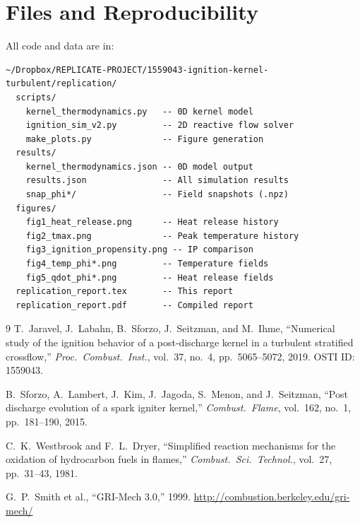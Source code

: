 \documentclass[11pt]{article}
\begin{document}
\section{Files and Reproducibility}

All code and data are in:
\begin{verbatim}
~/Dropbox/REPLICATE-PROJECT/1559043-ignition-kernel-turbulent/replication/
  scripts/
    kernel_thermodynamics.py   -- 0D kernel model
    ignition_sim_v2.py         -- 2D reactive flow solver
    make_plots.py              -- Figure generation
  results/
    kernel_thermodynamics.json -- 0D model output
    results.json               -- All simulation results
    snap_phi*/                 -- Field snapshots (.npz)
  figures/
    fig1_heat_release.png      -- Heat release history
    fig2_tmax.png              -- Peak temperature history
    fig3_ignition_propensity.png -- IP comparison
    fig4_temp_phi*.png         -- Temperature fields
    fig5_qdot_phi*.png         -- Heat release fields
  replication_report.tex       -- This report
  replication_report.pdf       -- Compiled report
\end{verbatim}

\begin{thebibliography}{9}
T.~Jaravel, J.~Labahn, B.~Sforzo, J.~Seitzman, and M.~Ihme,
``Numerical study of the ignition behavior of a post-discharge kernel in a turbulent stratified crossflow,''
\textit{Proc.\ Combust.\ Inst.}, vol.~37, no.~4, pp.~5065--5072, 2019.
OSTI ID: 1559043.

B.~Sforzo, A.~Lambert, J.~Kim, J.~Jagoda, S.~Menon, and J.~Seitzman,
``Post discharge evolution of a spark igniter kernel,''
\textit{Combust.\ Flame}, vol.~162, no.~1, pp.~181--190, 2015.

C.~K.~Westbrook and F.~L.~Dryer,
``Simplified reaction mechanisms for the oxidation of hydrocarbon fuels in flames,''
\textit{Combust.\ Sci.\ Technol.}, vol.~27, pp.~31--43, 1981.

G.~P.~Smith et al.,
``GRI-Mech 3.0,'' 1999.
\url{http://combustion.berkeley.edu/gri-mech/}
\end{thebibliography}
\end{document}
